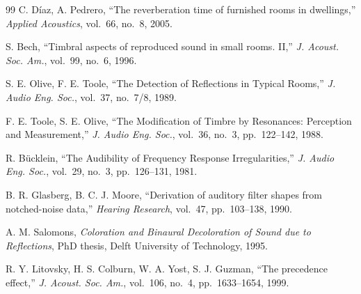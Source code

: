 \documentclass[11pt,a4paper]{article}
\begin{document}
\begin{thebibliography}{99}
 C. D\'iaz, A. Pedrero, ``The reverberation time of furnished rooms in dwellings,''
\emph{Applied Acoustics}, vol.~66, no.~8, 2005.

 S. Bech, ``Timbral aspects of reproduced sound in small rooms. II,'' \emph{J. Acoust.
Soc. Am.}, vol.~99, no.~6, 1996.

 S. E. Olive, F. E. Toole, ``The Detection of Reflections in Typical Rooms,''
\emph{J. Audio Eng. Soc.}, vol.~37, no.~7/8, 1989.

 F. E. Toole, S. E. Olive, ``The Modification of Timbre by Resonances: Perception and
Measurement,'' \emph{J. Audio Eng. Soc.}, vol.~36, no.~3, pp.~122--142, 1988.

 R. B\"ucklein, ``The Audibility of Frequency Response Irregularities,'' \emph{J. Audio
Eng. Soc.}, vol.~29, no.~3, pp.~126--131, 1981.

 B. R. Glasberg, B. C. J. Moore, ``Derivation of auditory filter shapes from
notched-noise data,'' \emph{Hearing Research}, vol.~47, pp.~103--138, 1990.

 A. M. Salomons, \emph{Coloration and Binaural Decoloration of Sound due to
Reflections}, PhD thesis, Delft University of Technology, 1995.

 R. Y. Litovsky, H. S. Colburn, W. A. Yost, S. J. Guzman, ``The precedence effect,''
\emph{J. Acoust. Soc. Am.}, vol.~106, no.~4, pp.~1633--1654, 1999.

\end{thebibliography}
\end{document}
